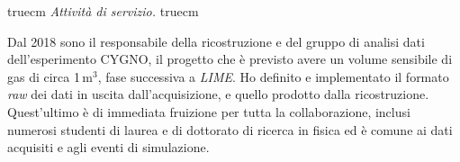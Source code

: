 \documentclass[11pt,twoside,a4paper]{article}
\begin{document}
 truecm
\textit{Attivit\`a di servizio.}
 truecm

Dal 2018 sono il responsabile della ricostruzione e del gruppo di
analisi dati dell'esperimento CYGNO, il progetto che \`e previsto
avere un volume sensibile di gas di circa 1\,m$^3$, fase successiva a
\textit{LIME}.  Ho definito e implementato il formato \textit{raw} dei
dati in uscita dall'acquisizione, e quello prodotto dalla
ricostruzione. Quest'ultimo \`e di immediata fruizione per tutta la
collaborazione, inclusi numerosi studenti di laurea e di dottorato di
ricerca in fisica ed \`e comune ai dati acquisiti e agli eventi di
simulazione.

\clearpage

\nocite{*}


\end{document}
